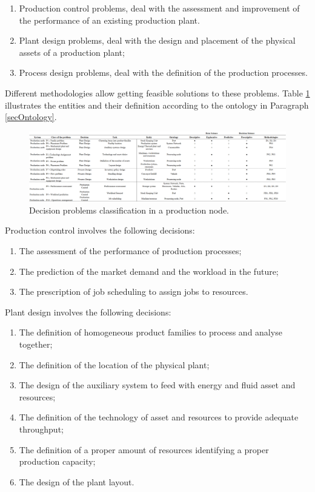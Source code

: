 \begin{enumerate}
    \item Production control problems, deal with the assessment and improvement of the performance of an existing production plant.
    \item Plant design problems, deal with the design and placement of the physical assets of a production plant;
    \item Process design problems, deal with the definition of the production processes.
\end{enumerate}

Different methodologies allow getting feasible solutions to these problems. Table \ref{tab_problems_prod} illustrates the entities and their definition according to the ontology in Paragraph \ref{secOntology}. 

\begin{landscape}
\thispagestyle{empty}
\begin{figure}[hbt!]
\centering
\includegraphics[width=1.5\textwidth]{sectionProduction/diagnosticModels_figures/tab_problems_prod.png}
\captionsetup{type=table}
\caption{Decision problems classification in a production node.}
\label{tab_problems_prod}
\end{figure}
\end{landscape}

Production control involves the following decisions:
\begin{enumerate}
    \item The assessment of the performance of production processes;
    \item The prediction of the market demand and the workload in the future;
    \item The prescription of job scheduling to assign jobs to resources.
\end{enumerate}

Plant design involves the following decisions:
\begin{enumerate}
    \item The definition of homogeneous product families to process and analyse together;
    \item The definition of the location of the physical plant;
    \item The design of the auxiliary system to feed with energy and fluid asset and resources;
    \item The definition of the technology of asset and resources to provide adequate throughput;
    \item The definition of a proper amount of resources identifying a proper production capacity;
    \item The design of the plant layout.

\end{enumerate}

